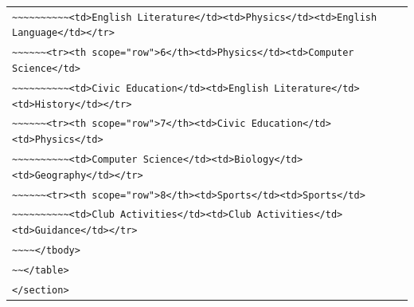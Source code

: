 \documentclass[11pt]{article}
\begin{document}
\begin{center}
\begin{tabular}{l}
\texttt{\textasciitilde{}\textasciitilde{}\textasciitilde{}\textasciitilde{}\textasciitilde{}\textasciitilde{}\textasciitilde{}\textasciitilde{}\textasciitilde{}\textasciitilde{}<td>English Literature</td><td>Physics</td><td>English Language</td></tr>} \\
\texttt{\textasciitilde{}\textasciitilde{}\textasciitilde{}\textasciitilde{}\textasciitilde{}\textasciitilde{}<tr><th scope="row">6</th><td>Physics</td><td>Computer Science</td>} \\
\texttt{\textasciitilde{}\textasciitilde{}\textasciitilde{}\textasciitilde{}\textasciitilde{}\textasciitilde{}\textasciitilde{}\textasciitilde{}\textasciitilde{}\textasciitilde{}<td>Civic Education</td><td>English Literature</td><td>History</td></tr>} \\
\texttt{\textasciitilde{}\textasciitilde{}\textasciitilde{}\textasciitilde{}\textasciitilde{}\textasciitilde{}<tr><th scope="row">7</th><td>Civic Education</td><td>Physics</td>} \\
\texttt{\textasciitilde{}\textasciitilde{}\textasciitilde{}\textasciitilde{}\textasciitilde{}\textasciitilde{}\textasciitilde{}\textasciitilde{}\textasciitilde{}\textasciitilde{}<td>Computer Science</td><td>Biology</td><td>Geography</td></tr>} \\
\texttt{\textasciitilde{}\textasciitilde{}\textasciitilde{}\textasciitilde{}\textasciitilde{}\textasciitilde{}<tr><th scope="row">8</th><td>Sports</td><td>Sports</td>} \\
\texttt{\textasciitilde{}\textasciitilde{}\textasciitilde{}\textasciitilde{}\textasciitilde{}\textasciitilde{}\textasciitilde{}\textasciitilde{}\textasciitilde{}\textasciitilde{}<td>Club Activities</td><td>Club Activities</td><td>Guidance</td></tr>} \\
\texttt{\textasciitilde{}\textasciitilde{}\textasciitilde{}\textasciitilde{}</tbody>} \\
\texttt{\textasciitilde{}\textasciitilde{}</table>} \\
\texttt{</section>}
\end{tabular}
\end{center}
\end{document}

